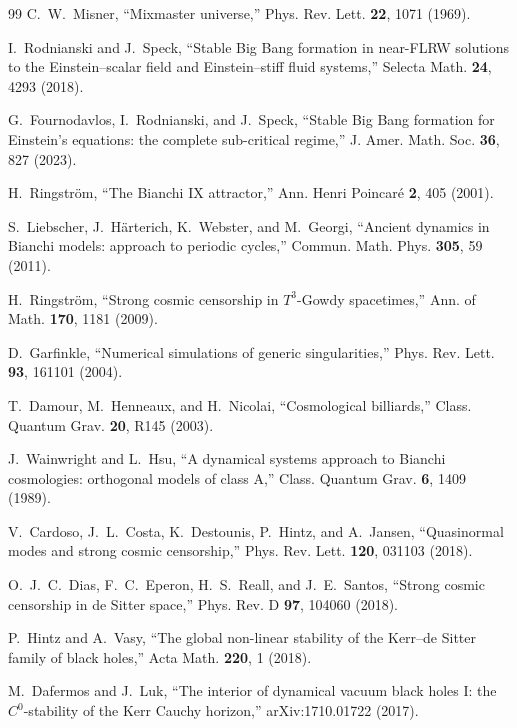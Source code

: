 \documentclass[11pt,letterpaper]{article}
\begin{document}
\begin{thebibliography}{99}
 C.~W.~Misner, ``Mixmaster universe,'' Phys. Rev. Lett. \textbf{22}, 1071 (1969).

 I.~Rodnianski and J.~Speck, ``Stable Big Bang formation in near-FLRW solutions to the Einstein--scalar field and Einstein--stiff fluid systems,'' Selecta Math. \textbf{24}, 4293 (2018).

 G.~Fournodavlos, I.~Rodnianski, and J.~Speck, ``Stable Big Bang formation for Einstein's equations: the complete sub-critical regime,'' J. Amer. Math. Soc. \textbf{36}, 827 (2023).

 H.~Ringstr\"om, ``The Bianchi IX attractor,'' Ann. Henri Poincar\'e \textbf{2}, 405 (2001).

 S.~Liebscher, J.~H\"arterich, K.~Webster, and M.~Georgi, ``Ancient dynamics in Bianchi models: approach to periodic cycles,'' Commun. Math. Phys. \textbf{305}, 59 (2011).

 H.~Ringstr\"om, ``Strong cosmic censorship in $T^3$-Gowdy spacetimes,'' Ann. of Math. \textbf{170}, 1181 (2009).

 D.~Garfinkle, ``Numerical simulations of generic singularities,'' Phys. Rev. Lett. \textbf{93}, 161101 (2004).

 T.~Damour, M.~Henneaux, and H.~Nicolai, ``Cosmological billiards,'' Class. Quantum Grav. \textbf{20}, R145 (2003).

 J.~Wainwright and L.~Hsu, ``A dynamical systems approach to Bianchi cosmologies: orthogonal models of class A,'' Class. Quantum Grav. \textbf{6}, 1409 (1989).

 V.~Cardoso, J.~L.~Costa, K.~Destounis, P.~Hintz, and A.~Jansen, ``Quasinormal modes and strong cosmic censorship,'' Phys. Rev. Lett. \textbf{120}, 031103 (2018).

 O.~J.~C.~Dias, F.~C.~Eperon, H.~S.~Reall, and J.~E.~Santos, ``Strong cosmic censorship in de Sitter space,'' Phys. Rev. D \textbf{97}, 104060 (2018).

 P.~Hintz and A.~Vasy, ``The global non-linear stability of the Kerr--de Sitter family of black holes,'' Acta Math. \textbf{220}, 1 (2018).

 M.~Dafermos and J.~Luk, ``The interior of dynamical vacuum black holes I: the $C^0$-stability of the Kerr Cauchy horizon,'' arXiv:1710.01722 (2017).


\end{thebibliography}
\end{document}
